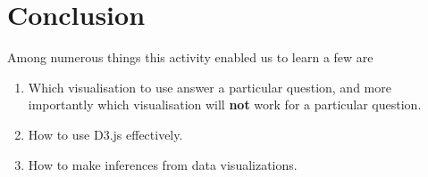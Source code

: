 \documentclass[titlepage, 12pt]{article}
\begin{document}
\section{Conclusion}
Among numerous things this activity enabled us to learn a few are
\begin{enumerate}

    \item Which visualisation to use answer a particular question, and more
        importantly which visualisation will \textbf{not} work for a particular
        question.

    \item How to use D3.js effectively.

    \item How to make inferences from data visualizations.

\end{enumerate}
\end{document}
